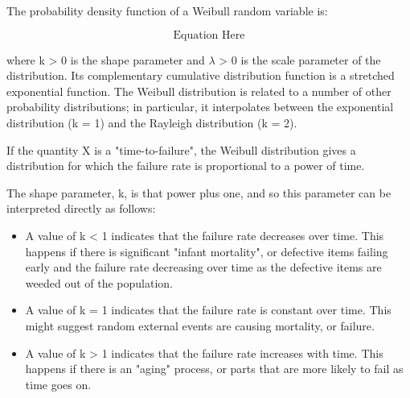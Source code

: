 The probability density function of a Weibull random variable is:

\[ \mbox{Equation Here} \]
 
where k > 0 is the shape parameter and $\lambda$ > 0 is the scale parameter of the distribution. Its complementary cumulative distribution function is a stretched exponential function. The Weibull distribution is related to a number of other probability distributions; in particular, it interpolates between the exponential distribution (k = 1) and the Rayleigh distribution (k = 2).
 
If the quantity X is a "time-to-failure", the Weibull distribution gives a distribution for which the failure rate is proportional to a power of time. 

The shape parameter, k, is that power plus one, and so this parameter can be interpreted directly as follows:
\begin{itemize}
\item A value of k < 1 indicates that the failure rate decreases over time. This happens if there is significant "infant mortality", or defective items failing early and the failure rate decreasing over time as the defective items are weeded out of the population.
\item A value of k = 1 indicates that the failure rate is constant over time. This might suggest random external events are causing mortality, or failure.
\item A value of k > 1 indicates that the failure rate increases with time. This happens if there is an "aging" process, or parts that are more likely to fail as time goes on.
\end{itemize}
